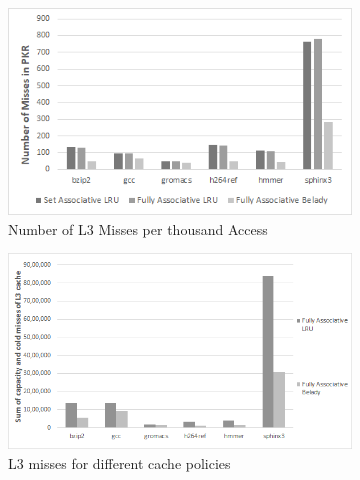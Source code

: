 \documentclass[]{article}
\begin{document}
\begin{figure}[!h] 
    \centering
		\centering 
	\begin{subfigure}[b]{7cm}	
		\includegraphics[scale=0.4]{L3missratepkr.png}
		\caption{ Number of L3 Misses per thousand Access} 
\end{subfigure}
\hspace{0cm} 
	\begin{subfigure}[b]{8cm} 
		\centering 
		\includegraphics[scale=0.33]{sumofcoldandcapacitymisses.png}
		\caption{L3 misses for different cache policies} 
	\end{subfigure}
\caption{}
\end{figure}\\
\end{document}
